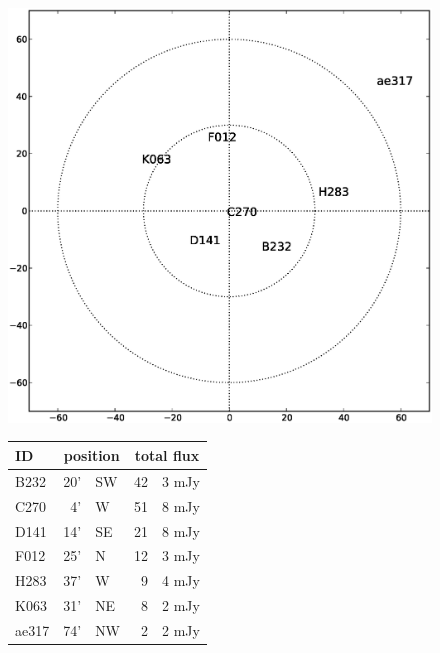 \documentclass[]{aa}
\begin{document}
\begin{figure}
\begin{minipage}[c]{.45\columnwidth}
\includegraphics[width=\textwidth]{source_plot}
\end{minipage}\hfill\begin{minipage}[c]{.5\columnwidth}
\begin{tabular}{lr@{ }lr@{.}l}
\hline
\hline
ID & \multicolumn{2}{c}{position} & \multicolumn{2}{c}{total flux} \\
\hline
B232  & 20' & SW & 42 & 3 mJy\\
C270  &  4' & W  & 51 & 8 mJy\\
D141  & 14' & SE & 21 & 8 mJy\\
F012  & 25' & N  & 12 & 3 mJy \\
H283  & 37' & W  &  9 & 4 mJy \\
K063  & 31' & NE &  8 & 2 mJy \\
ae317 & 74' & NW &  2 & 2 mJy \\
\hline
\end{tabular}
\end{minipage}


\end{figure}
\end{document}
